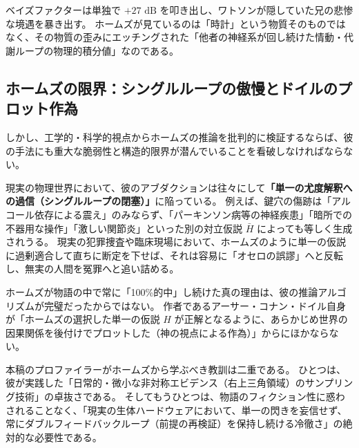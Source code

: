 ベイズファクターは単独で $+27\text{ dB}$ を叩き出し、ワトソンが隠していた兄の悲惨な境遇を暴き出す。
ホームズが見ているのは「時計」という物質そのものではなく、その物質の歪みにエッチングされた「他者の神経系が回し続けた情動・代謝ループの物理的積分値」なのである。

\subsection{ホームズの限界：シングルループの傲慢とドイルのプロット作為}
しかし、工学的・科学的視点からホームズの推論を批判的に検証するならば、彼の手法にも重大な脆弱性と構造的限界が潜んでいることを看破しなければならない。

現実の物理世界において、彼のアブダクションは往々にして\textbf{「単一の尤度解釈への過信（シングルループの閉塞）」}に陥っている。
例えば、鍵穴の傷跡は「アルコール依存による震え」のみならず、「パーキンソン病等の神経疾患」「暗所での不器用な操作」「激しい関節炎」といった別の対立仮説 $\bar{H}$ によっても等しく生成されうる。
現実の犯罪捜査や臨床現場において、ホームズのように単一の仮説に過剰適合して直ちに断定を下せば、それは容易に「オセロの誤謬」へと反転し、無実の人間を冤罪へと追い詰める。

ホームズが物語の中で常に「100\%的中」し続けた真の理由は、彼の推論アルゴリズムが完璧だったからではない。
作者であるアーサー・コナン・ドイル自身が「ホームズの選択した単一の仮説 $H$ が正解となるように、あらかじめ世界の因果関係を後付けでプロットした（神の視点による作為）」からにほかならない。

本稿のプロファイラーがホームズから学ぶべき教訓は二重である。
ひとつは、彼が実践した「日常的・微小な非対称エビデンス（右上三角領域）のサンプリング技術」の卓抜さである。
そしてもうひとつは、物語のフィクション性に惑わされることなく、「現実の生体ハードウェアにおいて、単一の閃きを妄信せず、常にダブルフィードバックループ（前提の再検証）を保持し続ける冷徹さ」の絶対的な必要性である。

